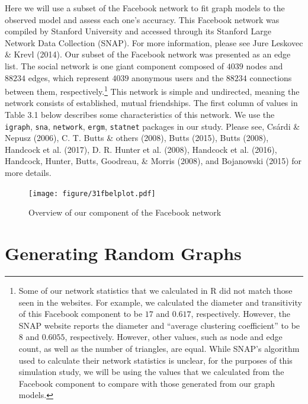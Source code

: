 \documentclass[12pt,twoside]{amherstthesis}
\begin{document}
  Here we will use a subset of the Facebook network to fit graph models to
  the observed model and assess each one's accuracy. This Facebook network
  was compiled by Stanford University and accessed through its Stanford
  Large Network Data Collection (SNAP). For more information, please see
  Jure Leskovec \& Krevl (2014). Our subset of the Facebook network was
  presented as an edge list. The social network is one giant component
  composed of \(4039\) nodes and \(88234\) edges, which represent \(4039\)
  anonymous users and the \(88234\) connections between them,
  respectively.\footnote{Some of our network statistics that we calculated
    in R did not match those seen in the websites. For example, we
    calculated the diameter and transitivity of this Facebook component to
    be \(17\) and \(0.617\), respectively. However, the SNAP website
    reports the diameter and ``average clustering coefficient'' to be
    \(8\) and \(0.6055\), respectively. However, other values, such as
    node and edge count, as well as the number of triangles, are equal.
    While SNAP's algorithm used to calculate their network statistics is
    unclear, for the purposes of this simulation study, we will be using
    the values that we calculated from the Facebook component to compare
    with those generated from our graph models.} This network is simple
  and undirected, meaning the network consists of established, mutual
  friendships. The first column of values in Table 3.1 below describes
  some characteristics of this network. We use the \texttt{igraph},
  \texttt{sna}, \texttt{network}, \texttt{ergm}, \texttt{statnet} packages
  in our study. Please see, Csárdi \& Nepusz (2006), C. T. Butts \& others
  (2008), Butts (2015), Butts (2008), Handcock et al. (2017), D. R. Hunter
  et al. (2008), Handcock et al. (2016), Handcock, Hunter, Butts,
  Goodreau, \& Morris (2008), and Bojanowski (2015) for more details.
  
  \begin{figure}[htbp]
  \centering
  \texttt{[image: figure/31fbelplot.pdf]}
  \caption{Overview of our component of the Facebook network}
  \end{figure}
  
  \section{Generating Random Graphs}\label{generating-random-graphs}
  
\end{document}
